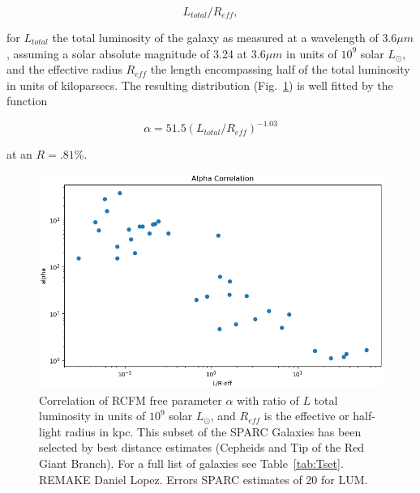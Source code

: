 \documentclass[reprint,%
 amsmath,amssymb,
 aps,
]{revtex4-1}
\begin{document}
\begin{equation}
    L_{total}/R_{eff}, 
\end{equation}
 
 for  $L_{total}$    the  total luminosity of the galaxy as measured  at a wavelength of $3.6 \mu m$,  assuming a solar
absolute magnitude of 3.24 at $3.6 \mu m$ \cite{oh2008high}   in units of $10^9$ solar  $L_\odot$, and the effective radius $R_{eff}$    the length encompassing half of the total luminosity \cite{2016Lelli} in units of kiloparsecs. 
 The resulting distribution    (Fig.~\ref{alpha2}) is  well fitted by the function 
 
    
\begin{equation}
    \alpha =  
    51.5 (L_{total}/R_{eff})^{-1.03}
       \label{FreeParamFix}
\end{equation}

at an $R = .81\%$.
  
 \begin{figure} 
\includegraphics[width=\linewidth]{figures/Alpha_Correlation.png} 
\caption{ Correlation of RCFM free parameter $\alpha$ with ratio of  $L$ total luminosity   in units of $10^9$ solar  $L_\odot$,  and  $R_{eff}$ is the effective or half-light radius in kpc.
 This subset of the SPARC Galaxies has been selected by best distance estimates   (Cepheids and Tip of the Red Giant Branch).
For a full list of galaxies see  Table~\ref{tab:Tset}.  {\color{blue}REMAKE Daniel Lopez.  Errors   SPARC estimates of 20 for LUM}.  }
\label{alpha2}
\end{figure}  
\end{document}
